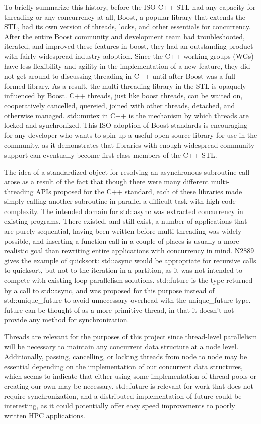 To briefly summarize this history, before the ISO C++ STL had any capacity for threading or any concurrency at all, Boost, a popular library that extends the STL, had its own version of threads, locks, and other essentials for concurrency. After the entire Boost community and development team had troubleshooted, iterated, and improved these features in boost, they had an outstanding product with fairly widespread industry adoption. Since the C++ working groups (WGs) have less flexibility and agility in the implementation of a new feature, they did not get around to discussing threading in C++ until after Boost was a full-formed library. As a result, the multi-threading library in the STL is opaquely influenced by Boost. C++ threads, just like boost threads, can be waited on, cooperatively cancelled, quereied, joined with other threads, detached, and otherwise managed. std::mutex in C++ is the mechanism by which threads are locked and synchronized. This ISO adoption of Boost standards is encouraging for any developer who wants to spin up a useful open-source library for use in the community, as it demonstrates that libraries with enough widespread community support can eventually become first-class members of the C++ STL. 

The idea of a standardized object for resolving an asynchronous subroutine call arose as a result of the fact that though there were many different multi-threading APIs proposed for the C++ standard, each of these libraries made simply calling another subroutine in parallel a difficult task with high code complexity. The intended domain for std::async was extracted concurrency in existing programs. There existed, and still exist, a number of applications that are purely sequential, having been written before multi-threading was widely possible, and inserting a function call in a couple of places is usually a more realistic goal than rewriting entire applications with concurrency in mind. N2889 gives the example of quicksort: std::async would be appropriate for recursive calls to quicksort, but not to the iteration in a partition, as it was not intended to compete with existing loop-parallelism solutions. std::future is the type returned by a call to std::async, and was proposed for this purpose instead of std::unique\_future to avoid unnecessary overhead with the unique\_future type. future can be thought of as a more primitive thread, in that it doesn't not provide any method for synchronization. 

Threads are relevant for the purposes of this project since thread-level parallelism will be necessary to maintain any concurrent data structure at a node level. Additionally, passing, cancelling, or locking threads from node to node may be essential depending on the implementation of our concurrent data structures, which seems to indicate that either using some implementation of thread pools or creating our own may be necessary. std::future is relevant for work that does not require synchronization, and a distributed implementation of future could be interesting, as it could potentially offer easy speed improvements to poorly written HPC applications. 


